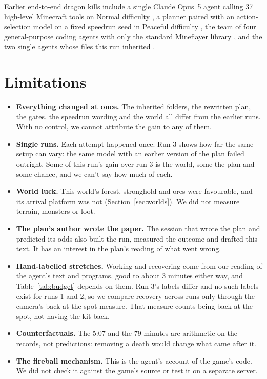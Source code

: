 \documentclass[11pt,a4paper]{article}
\begin{document}
Earlier end-to-end dragon kills include a single Claude Opus~5 agent calling 37 high-level Minecraft tools on Normal difficulty \citep{aibengineering2026}, a planner paired with an action-selection model on a fixed speedrun seed in Peaceful difficulty \citep{malde2026astra}, the team of four general-purpose coding agents with only the standard Mineflayer library \citep{faldor2026team}, and the two single agents whose files this run inherited \citep{batsuk2026single,batsuk2026second}.

\section{Limitations}
\label{sec:limits}

\begin{itemize}
  \item \textbf{Everything changed at once.} The inherited folders, the rewritten plan, the gates, the speedrun wording and the world all differ from the earlier runs. With no control, we cannot attribute the gain to any of them.
  \item \textbf{Single runs.} Each attempt happened once. Run 3 shows how far the same setup can vary: the same model with an earlier version of the plan failed outright. Some of this run's gain over run 3 is the world, some the plan and some chance, and we can't say how much of each.
  \item \textbf{World luck.} This world's forest, stronghold and ores were favourable, and its arrival platform was not (Section~\ref{sec:worlds}). We did not measure terrain, monsters or loot.
  \item \textbf{The plan's author wrote the paper.} The session that wrote the plan and predicted its odds also built the run, measured the outcome and drafted this text. It has an interest in the plan's reading of what went wrong.
  \item \textbf{Hand-labelled stretches.} Working and recovering come from our reading of the agent's text and programs, good to about 3 minutes either way, and Table~\ref{tab:budget} depends on them. Run 3's labels differ and no such labels exist for runs 1 and 2, so we compare recovery across runs only through the camera's back-at-the-spot measure. That measure counts being back at the spot, not having the kit back.
  \item \textbf{Counterfactuals.} The 5:07 and the 79 minutes are arithmetic on the records, not predictions: removing a death would change what came after it.
  \item \textbf{The fireball mechanism.} This is the agent's account of the game's code. We did not check it against the game's source or test it on a separate server.

\end{itemize}
\end{document}
